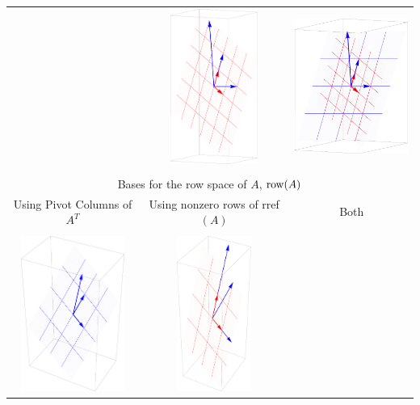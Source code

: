 \begin{table}
\begin{tabular}{ccc}
&\includegraphics[height=2in]{02-Applications/support/colspace2}
&\includegraphics[height=2in]{02-Applications/support/colspace3}
\\ \\
\hline\hline \multicolumn{3}{c}{Bases for the row space of $A$, $\operatorname{row}(A)$}\\
\hline Using Pivot Columns of $A^T$ & Using nonzero rows of rref$(A)$ & Both\\ \\
\includegraphics[height=2in]{02-Applications/support/rowspace1}
&\includegraphics[height=2in]{02-Applications/support/rowspace2}

\end{tabular}
\end{table}
